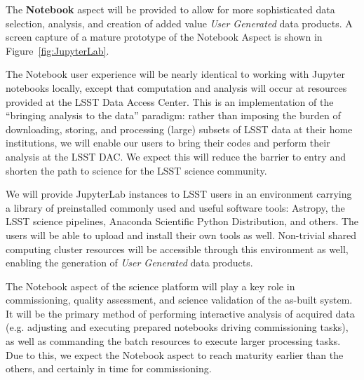 The \textbf{Notebook} aspect
will be provided to allow for more sophisticated data selection, analysis, and creation of added value \textit{User Generated} data products. 
A screen capture of a mature prototype of the Notebook Aspect is shown in Figure~\ref{fig:JupyterLab}.

The Notebook user experience will be nearly identical to working with
Jupyter notebooks locally, except that computation and analysis will occur
at resources provided at the LSST Data Access Center.  This is an
implementation of the “bringing analysis to the data” paradigm: rather
than imposing the burden of downloading, storing, and processing (large)
subsets of LSST data at their home institutions, we will enable our users to
bring their codes and perform their analysis at the LSST DAC.  We expect
this will reduce the barrier to entry and shorten the path to science for
the LSST science community.

We will provide JupyterLab instances to LSST users in an environment carrying a
library of preinstalled commonly used and useful software tools:
Astropy, the LSST science pipelines, Anaconda Scientific Python Distribution, and others. 
The users will be able to upload and install their own tools as well.
Non-trivial shared computing cluster resources will be accessible through this environment as well, enabling the generation of \textit{User Generated} data products.


The Notebook aspect of the science platform will play a key role in commissioning,
quality assessment, and science validation of the as-built system. It will be the primary
method of performing interactive analysis of acquired data (e.g. adjusting and executing
prepared notebooks driving commissioning tasks), as well as commanding
the batch resources to execute larger processing tasks. Due to this, we expect the
Notebook aspect to reach maturity earlier than the others, and certainly in time for
commissioning.


